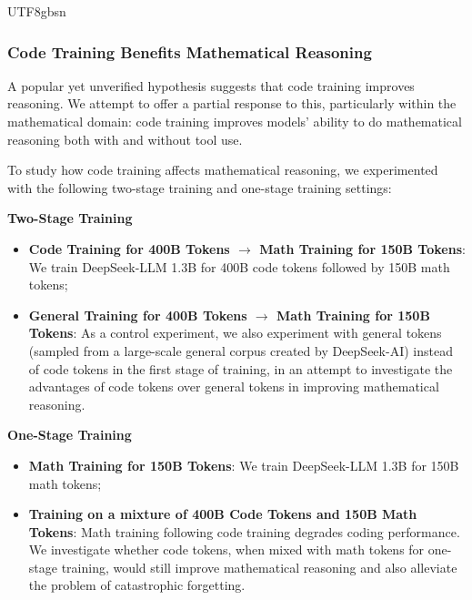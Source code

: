 \documentclass[11pt, a4paper, logo, copyright, nonumbering]{deepseek}
\begin{document}
\begin{CJK*}{UTF8}{gbsn}
\subsubsection{Code Training Benefits Mathematical Reasoning}

A popular yet unverified hypothesis suggests that code training improves reasoning.
We attempt to offer a partial response to this, particularly within the mathematical domain:
code training improves models' ability to do mathematical reasoning both with and without tool use.

To study how code training affects mathematical reasoning, we experimented with the following two-stage training and one-stage training settings:

\noindent
\textbf{Two-Stage Training} 
\begin{itemize}[topsep=0pt]
    \item \textbf{Code Training for 400B Tokens $\rightarrow$ Math Training for 150B Tokens}:
    We train DeepSeek-LLM 1.3B for 400B code tokens followed by 150B math tokens;
    \item \textbf{General Training for 400B Tokens $\rightarrow$ Math Training for 150B Tokens}:
    As a control experiment, we also experiment with general tokens (sampled from a large-scale general corpus created by DeepSeek-AI) instead of code tokens in the first stage of training, in an attempt to investigate the advantages of code tokens over general tokens in improving mathematical reasoning.
\end{itemize}

\noindent
\textbf{One-Stage Training}
\begin{itemize}[topsep=0pt]
    \item \textbf{Math Training for 150B Tokens}:
    We train DeepSeek-LLM 1.3B for 150B math tokens;
    \item \textbf{Training on a mixture of 400B Code Tokens and 150B Math Tokens}:
    Math training following code training degrades coding performance.
    We investigate whether code tokens, when mixed with math tokens for one-stage training, would still improve mathematical reasoning and also alleviate the problem of catastrophic forgetting.
\end{itemize}


\end{CJK*}
\end{document}
